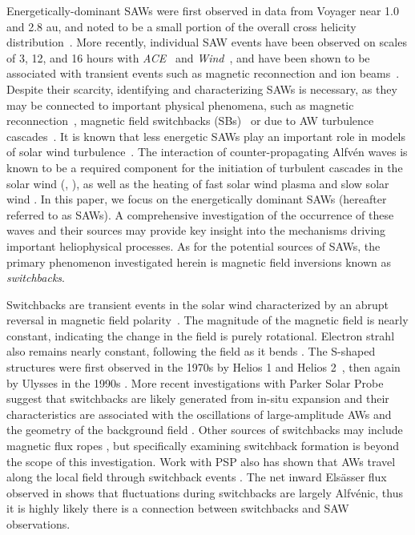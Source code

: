 \documentclass[twocolumn, times]{aastex631}
\begin{document}
Energetically-dominant SAWs were first observed in data from Voyager near 1.0 and 2.8 au, and noted to be a small portion of the overall cross helicity distribution~\citep{matthaeus1982}. More recently, individual SAW events have been observed on scales of 3, 12, and 16 hours with \emph{ACE}~\citep{gosling2009} and \emph{Wind}~\citep{li2016}, and have been shown to be associated with transient events such as magnetic reconnection and ion beams~\citep{he2015}. Despite their scarcity, identifying and characterizing SAWs is necessary, as they may be connected to important physical phenomena, such as magnetic reconnection~\citep{gosling2005, gosling2009, kigure2010}, magnetic field switchbacks (SBs)~\citep{bourouaine2020, schwadron2021, mallet2021} or due to AW turbulence cascades~\citep{perez09,perez12}. It is known that less energetic SAWs play an important role in models of solar wind turbulence~\citep{terres2024}. The interaction of counter-propagating Alfv\'en waves is known to be a required component for the initiation of turbulent cascades in the solar wind (\cite{bruno13}, \cite{tu95}), as well as the heating of fast solar wind plasma \citep{chandran09, cranmer2009,perez13} and slow solar wind \citep{damicis2019, bourouaine2024}. In this paper, we focus on the energetically dominant SAWs (hereafter referred to as SAWs). A comprehensive investigation of the occurrence of these waves and their sources may provide key insight into the mechanisms driving important heliophysical processes. As for the potential sources of SAWs, the primary phenomenon investigated herein is magnetic field inversions known as \emph{switchbacks}.

Switchbacks are transient events in the solar wind characterized by an abrupt reversal in magnetic field polarity~\citep{kasper2019, bale2019, dudok2020, bourouaine2020, jagarlamudi2023, raouafi2023}. The magnitude of the magnetic field is nearly constant, indicating the change in the field is purely rotational. Electron strahl also remains nearly constant, following the field as it bends \citep{halekas2020}. The S-shaped structures were first observed in the 1970s by Helios 1 and Helios 2~\citep{neubauer77}, then again by Ulysses in the 1990s \citep{balogh99}. More recent investigations with Parker Solar Probe suggest that switchbacks are likely generated from in-situ expansion \citep{tenerani21} and their characteristics are associated with the oscillations of large-amplitude AWs and the geometry of the background field \citep{bourouaine22}. Other sources of switchbacks may include magnetic flux ropes \citep{drake2021}, but specifically examining switchback formation is beyond the scope of this investigation. Work with PSP also has shown that AWs travel along the local field through switchback events \citep{mcmanus2020}. The net inward Els\"asser flux observed in \cite{mcmanus2020} shows that fluctuations during switchbacks are largely Alfv\'enic, thus it is highly likely there is a connection between switchbacks and SAW observations.
\end{document}
